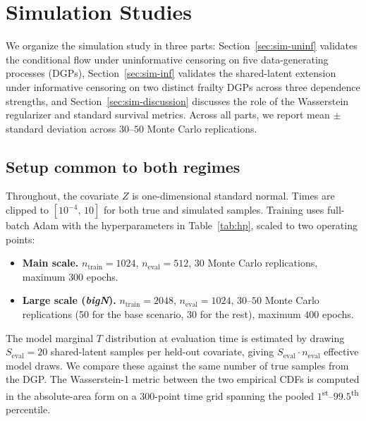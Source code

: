 \section{Simulation Studies}
\label{sec:sim}

We organize the simulation study in three parts:
Section~\ref{sec:sim-uninf} validates the conditional flow under
uninformative censoring on five data-generating processes (DGPs),
Section~\ref{sec:sim-inf} validates the shared-latent extension under
informative censoring on two distinct frailty DGPs across three
dependence strengths, and Section~\ref{sec:sim-discussion} discusses
the role of the Wasserstein regularizer and standard survival metrics.
Across all parts, we report mean $\pm$ standard deviation across
$30$--$50$ Monte Carlo replications.

\subsection{Setup common to both regimes}
\label{sec:sim-setup}

Throughout, the covariate $Z$ is one-dimensional standard normal. Times
are clipped to $[10^{-4},\, 10]$ for both true and simulated samples.
Training uses full-batch Adam with the hyperparameters in
Table~\ref{tab:hp}, scaled to two operating points:
\begin{itemize}
    \item \textbf{Main scale.} $n_{\text{train}} = 1024$,
          $n_{\text{eval}} = 512$, $30$ Monte Carlo replications,
          maximum $300$ epochs.
    \item \textbf{Large scale (\emph{bigN}).} $n_{\text{train}} = 2048$,
          $n_{\text{eval}} = 1024$, $30$--$50$ Monte Carlo replications
          (50 for the base scenario, $30$ for the rest), maximum $400$
          epochs.
\end{itemize}
The model marginal $T$ distribution at evaluation time is estimated by
drawing $S_{\text{eval}} = 20$ shared-latent samples per held-out
covariate, giving $S_{\text{eval}} \cdot n_{\text{eval}}$ effective model
draws. We compare these against the same number of true samples from the
DGP. The Wasserstein-1 metric between the two empirical CDFs is computed
in the absolute-area form on a $300$-point time grid spanning the pooled
$1$\textsuperscript{st}--$99.5$\textsuperscript{th} percentile.

